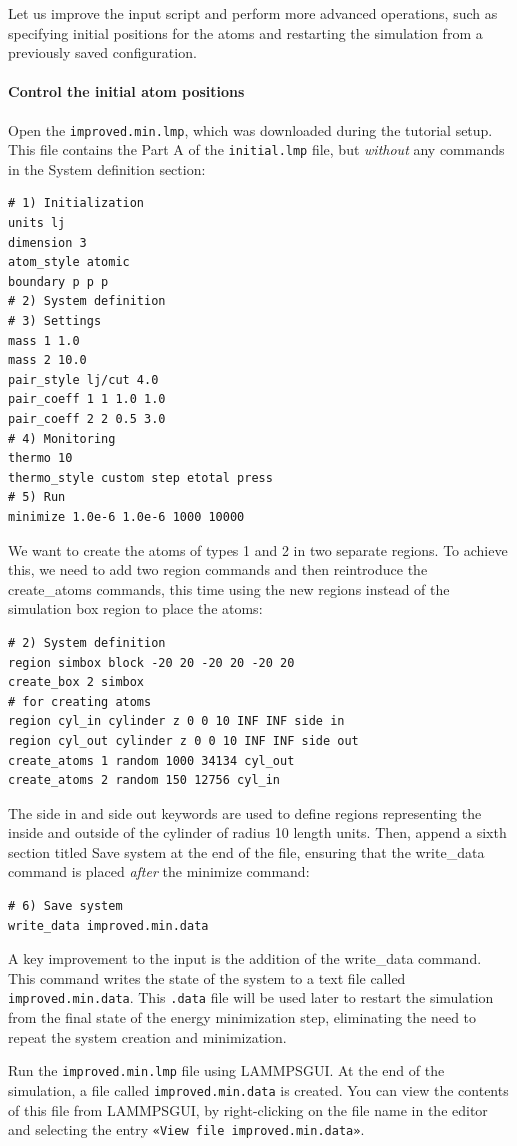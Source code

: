 \documentclass[9pt,tutorial]{livecoms}
\newcommand{\lmpcmd}[1]{\colorbox{listing}{\textcolor{command}{\small{#1}}}} %
\newcommand{\flecmd}[1]{\textcolor{command}{\texttt{#1}}} %
\newcommand{\guicmd}[1]{\textcolor{command}{\texttt{«#1»}}} %
\newcommand{\lammpsgui}{\textsf{LAMMPS\textendash GUI}}
\begin{document}
Let us improve the input script and perform more advanced operations,
such as specifying initial positions for the atoms and restarting the
simulation from a previously saved configuration.

\paragraph{Control the initial atom positions}

Open the \flecmd{improved.min.lmp}, which was downloaded during the
tutorial setup.  This file contains the \lmpcmd{Part A} of the
\flecmd{initial.lmp} file, but \emph{without} any
commands in the \lmpcmd{System definition} section:
\begin{lstlisting}
# 1) Initialization
units lj
dimension 3
atom_style atomic
boundary p p p
# 2) System definition
# 3) Settings
mass 1 1.0
mass 2 10.0
pair_style lj/cut 4.0
pair_coeff 1 1 1.0 1.0
pair_coeff 2 2 0.5 3.0
# 4) Monitoring
thermo 10
thermo_style custom step etotal press
# 5) Run
minimize 1.0e-6 1.0e-6 1000 10000
\end{lstlisting}
We want to create the atoms of types 1 and 2 in two separate
regions.  To achieve this, we need to add two \lmpcmd{region} commands and then
reintroduce the \lmpcmd{create\_atoms} commands, this time using the new
regions instead of the simulation box region to place the atoms:
\begin{lstlisting}
# 2) System definition
region simbox block -20 20 -20 20 -20 20
create_box 2 simbox
# for creating atoms
region cyl_in cylinder z 0 0 10 INF INF side in
region cyl_out cylinder z 0 0 10 INF INF side out
create_atoms 1 random 1000 34134 cyl_out
create_atoms 2 random 150 12756 cyl_in
\end{lstlisting}
The \lmpcmd{side in} and \lmpcmd{side out} keywords are used to define
regions representing the inside and outside of the cylinder of radius
10 length units.  Then, append a sixth section titled \lmpcmd{Save system} at the end
of the file, ensuring that the \lmpcmd{write\_data} command is placed \emph{after}
the \lmpcmd{minimize} command:
\begin{lstlisting}
# 6) Save system
write_data improved.min.data
\end{lstlisting}

\begin{note}
  A key improvement to the input is the addition of the
  \lmpcmd{write\_data} command.  This command writes the state of the
  system to a text file called \flecmd{improved.min.data}.  This
  \flecmd{.data} file will be used later to restart the simulation from
  the final state of the energy minimization step, eliminating the need
  to repeat the system creation and minimization.
\end{note}
Run the \flecmd{improved.min.lmp} file using \lammpsgui{}.  At the end
of the simulation, a file called \flecmd{improved.min.data} is created.
You can view the contents of this file from \lammpsgui{}, by
right-clicking on the file name in the editor and selecting the entry
\guicmd{View file improved.min.data}.
\end{document}
